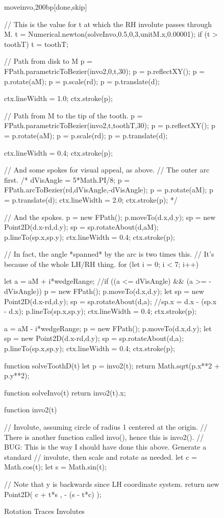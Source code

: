 \documentclass[10pt]{article}
\begin{document}
\begin{figure}[b!]
\begin{figput}{moveinvo,200bp}[done,skip]
{  // This is the value for t at which the RH involute passes through M.
  t = Numerical.newton(solveInvo,0.5,0,3,unitM.x,0.00001);
  if (t > toothT) t = toothT;

  // Path from disk to M
  p = FPath.parametricToBezier(invo2,0,t,30);
  p = p.reflectXY();
  p = p.rotate(aM);
  p = p.scale(rd);
  p = p.translate(d);
  
  ctx.lineWidth = 1.0;
  ctx.stroke(p);

  // Path from M to the tip of the tooth.
  p = FPath.parametricToBezier(invo2,t,toothT,30);
  p = p.reflectXY();
  p = p.rotate(aM);
  p = p.scale(rd);
  p = p.translate(d);
  
  ctx.lineWidth = 0.4;
  ctx.stroke(p);

  // And some spokes for visual appeal, as above.
  // The outer arc first.
  /*
  dVisAngle = 5*Math.PI/8;
  p = FPath.arcToBezier(rd,dVisAngle,-dVisAngle);
  p = p.rotate(aM);
  p = p.translate(d);
  ctx.lineWidth = 2.0;
  ctx.stroke(p);
  */
  
  // And the spokes.
  p = new FPath();
  p.moveTo(d.x,d.y);
  sp = new Point2D(d.x-rd,d.y);
  sp = sp.rotateAbout(d,aM);
  p.lineTo(sp.x,sp.y);
  ctx.lineWidth = 0.4;
  ctx.stroke(p);

  // In fact, the angle *spanned* by the arc is two times this.
  // It's because of the whole LH/RH thing.
  for (let i = 0; i < 7; i++)
    {
      let a = aM + i*wedgeRange;
      //if ((a <= dVisAngle) && (a >= -dVisAngle))
        {
          p = new FPath();
          p.moveTo(d.x,d.y);
          let sp = new Point2D(d.x-rd,d.y);
          sp = sp.rotateAbout(d,a);
          //sp.x = d.x - (sp.x - d.x);
          p.lineTo(sp.x,sp.y);
          ctx.lineWidth = 0.4;
          ctx.stroke(p);
        }

      a = aM - i*wedgeRange;
      p = new FPath();
      p.moveTo(d.x,d.y);
      let sp = new Point2D(d.x-rd,d.y);
      sp = sp.rotateAbout(d,a);
      p.lineTo(sp.x,sp.y);
      ctx.lineWidth = 0.4;
      ctx.stroke(p);
    }
}

function solveToothD(t) {
  let p = invo2(t);
  return Math.sqrt(p.x**2 + p.y**2);
}

function solveInvo(t) {
  return invo2(t).x;
}

function invo2(t) {

  // Involute, assuming circle of radius 1 centered at the origin.
  // There is another function called invo(), hence this is invo2().
  // BUG: This is the way I should have done this above. Generate a standard
  // involute, then scale and rotate as needed.
  let c = Math.cos(t);
  let s = Math.sin(t);

  // Note that y is backwards since LH coordinate system.
  return new Point2D( c + t*s , - (s - t*c) );
}
\end{figput}
\caption{Rotation Traces Involutes}
\label{fig-moving-involute}
\end{figure}
\end{document}
